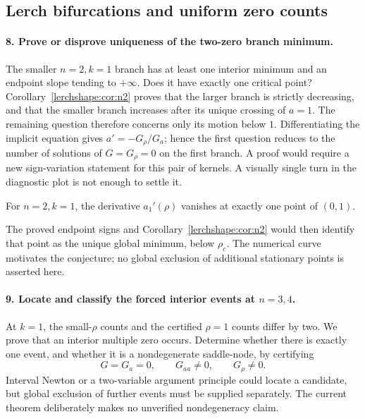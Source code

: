 \subsection{Lerch bifurcations and uniform zero counts}

\paragraph{8. Prove or disprove uniqueness of the two-zero branch minimum.}
The smaller $n=2,k=1$ branch has at least one interior minimum and
an endpoint slope tending to $+\infty$. Does it have exactly one
critical point? Corollary~\ref{lerchshape:cor:n2} proves that the
larger branch is strictly decreasing, and that the smaller branch
increases after its unique crossing of $a=1$. The remaining question
therefore concerns only its motion below $1$. Differentiating the implicit equation gives
$a'=-G_\rho/G_a$; hence the first question reduces to the number of
solutions of $G=G_\rho=0$ on the first branch. A proof would require
a new sign-variation statement for this pair of kernels. A visually
single turn in the diagnostic plot is not enough to settle it.

\begin{conjecture}
\label{research:conj:minimum}
For $n=2,k=1$, the derivative $a_1'(\rho)$ vanishes at exactly one
point of $(0,1)$.
\end{conjecture}
The proved endpoint signs and Corollary~\ref{lerchshape:cor:n2}
would then identify that point as the unique global minimum, below
$\rho_c$. The numerical curve motivates the conjecture; no global
exclusion of additional stationary points is asserted here.

\paragraph{9. Locate and classify the forced interior events at $n=3,4$.}
At $k=1$, the small-$\rho$ counts and the certified $\rho=1$ counts
differ by two. We prove that an interior multiple zero occurs.
Determine whether there is exactly one event, and whether it is a
nondegenerate saddle-node, by certifying
\[
G=G_a=0,\qquad G_{aa}\ne0,\qquad G_\rho\ne0.
\]
Interval Newton or a two-variable argument principle could locate a
candidate, but global exclusion of further events must be supplied
separately. The current theorem deliberately makes no unverified
nondegeneracy claim.


